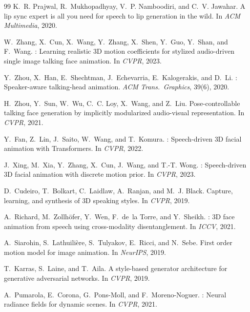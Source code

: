 \documentclass[10pt,twocolumn,letterpaper]{article}
\begin{document}
{\begin{thebibliography}{99}
K.~R. Prajwal, R.~Mukhopadhyay, V.~P. Namboodiri, and C.~V. Jawahar.
\newblock A lip sync expert is all you need for speech to lip generation in the wild.
\newblock In \emph{ACM Multimedia}, 2020.

W.~Zhang, X.~Cun, X.~Wang, Y.~Zhang, X.~Shen, Y.~Guo, Y.~Shan, and F.~Wang.
: Learning realistic {3D} motion coefficients for stylized audio-driven single image talking face animation.
\newblock In \emph{CVPR}, 2023.

Y.~Zhou, X.~Han, E.~Shechtman, J.~Echevarria, E.~Kalogerakis, and D.~Li.
: Speaker-aware talking-head animation.
\newblock \emph{ACM Trans.\ Graphics}, 39(6), 2020.

H.~Zhou, Y.~Sun, W.~Wu, C.~C. Loy, X.~Wang, and Z.~Liu.
\newblock Pose-controllable talking face generation by implicitly modularized audio-visual representation.
\newblock In \emph{CVPR}, 2021.

Y.~Fan, Z.~Lin, J.~Saito, W.~Wang, and T.~Komura.
: Speech-driven {3D} facial animation with {Transformers}.
\newblock In \emph{CVPR}, 2022.

J.~Xing, M.~Xia, Y.~Zhang, X.~Cun, J.~Wang, and T.-T. Wong.
: Speech-driven {3D} facial animation with discrete motion prior.
\newblock In \emph{CVPR}, 2023.

D.~Cudeiro, T.~Bolkart, C.~Laidlaw, A.~Ranjan, and M.~J. Black.
\newblock Capture, learning, and synthesis of {3D} speaking styles.
\newblock In \emph{CVPR}, 2019.

A.~Richard, M.~Zollh{\"o}fer, Y.~Wen, F.~de~la Torre, and Y.~Sheikh.
: {3D} face animation from speech using cross-modality disentanglement.
\newblock In \emph{ICCV}, 2021.

A.~Siarohin, S.~Lathuili{\`e}re, S.~Tulyakov, E.~Ricci, and N.~Sebe.
\newblock First order motion model for image animation.
\newblock In \emph{NeurIPS}, 2019.

T.~Karras, S.~Laine, and T.~Aila.
\newblock A style-based generator architecture for generative adversarial networks.
\newblock In \emph{CVPR}, 2019.

A.~Pumarola, E.~Corona, G.~Pons-Moll, and F.~Moreno-Noguer.
: Neural radiance fields for dynamic scenes.
\newblock In \emph{CVPR}, 2021.


\end{thebibliography}}
\end{document}
